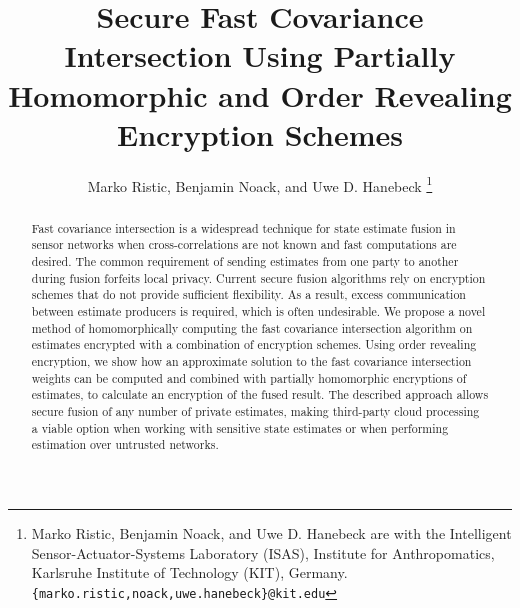 \documentclass[letterpaper, 10 pt, conference]{ieeeconf}  %
\title{\LARGE \bf
Secure Fast Covariance Intersection Using Partially Homomorphic and Order Revealing Encryption Schemes
}
\author{Marko Ristic, Benjamin Noack, and Uwe D. Hanebeck%
\thanks{Marko Ristic, Benjamin Noack, and Uwe D. Hanebeck are with the Intelligent Sensor-Actuator-Systems Laboratory (ISAS), Institute for Anthropomatics, Karlsruhe Institute of Technology (KIT), Germany.\newline
{\tt\small \{marko.ristic,noack,uwe.hanebeck\}@kit.edu}%
}%
}
\begin{document}
\maketitle
\thispagestyle{empty}
\pagestyle{empty}





\begin{abstract}

Fast covariance intersection is a widespread technique for state estimate fusion in sensor networks when cross-correlations are not known and fast computations are desired. The common requirement of sending estimates from one party to another during fusion forfeits local privacy. Current secure fusion algorithms rely on encryption schemes that do not provide sufficient flexibility. As a result, excess communication between estimate producers is required, which is often undesirable. We propose a novel method of homomorphically computing the fast covariance intersection algorithm on estimates encrypted with a combination of encryption schemes. Using order revealing encryption, we show how an approximate solution to the fast covariance intersection weights can be computed and combined with partially homomorphic encryptions of estimates, to calculate an encryption of the fused result. The described approach allows secure fusion of any number of private estimates, making third-party cloud processing a viable option when working with sensitive state estimates or when performing estimation over untrusted networks.

\end{abstract}


\end{document}

